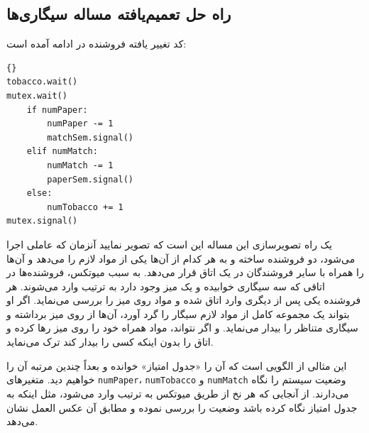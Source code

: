 \documentclass{book}
\begin{document}
\subsection{راه حل تعمیم‌یافته مساله سیگاری‌ها}
\label{smoker}

    کد تغییر یافته فروشنده  در ادامه آمده است: 

\begin{latin}
\begin{latin}
\begin{lstlisting}[title={\rl{فروشنده} A}]{}
tobacco.wait()
mutex.wait()
    if numPaper:
        numPaper -= 1
        matchSem.signal()
    elif numMatch:
        numMatch -= 1
        paperSem.signal()
    else: 
        numTobacco += 1
mutex.signal()
\end{lstlisting}
\end{latin}
\end{latin}

    یک راه تصویرسازی این مساله این است که تصویر نمایید آنزمان که عاملی اجرا می‌شود‌، دو فروشنده ساخته و به هر کدام از آن‌ها یکی از مواد لازم را 
    می‌دهد و آن‌ها را همراه با سایر فروشندگان در یک اتاق قرار می‌دهد. به سبب میوتکس، فروشنده‌ها در اتاقی که سه سیگاری خوابیده و یک میز وجود دارد 
    به ترتیب وارد می‌شوند. هر فروشنده یکی پس از دیگری وارد اتاق شده و مواد روی میز را بررسی می‌نماید. اگر او بتواند یک مجموعه کامل از مواد لازم سیگار را
    گرد آورد، آن‌ها از روی میز برداشته و سیگاری متناظر را بیدار می‌نماید. و اگر نتواند،‌ مواد همراه خود را روی میز رها کرده و اتاق را بدون اینکه کسی را 
    بیدار کند ترک می‌نماید. 

    این مثالی از الگویی است که آن را «جدول امتیاز» خوانده و بعداً چندین مرتبه آن را خواهیم دید.   
    متغیرهای     {\tt numPaper}، {\tt numTobacco} و  {\tt numMatch}    وضعیت سیستم را نگاه می‌دارند. 
    از آنجایی که هر نخ از طریق میوتکس به ترتیب وارد می‌شود، مثل اینکه به جدول امتیاز نگاه کرده باشد وضعیت را بررسی نموده و مطابق آن عکس العمل نشان می‌دهد. 
\end{document}

